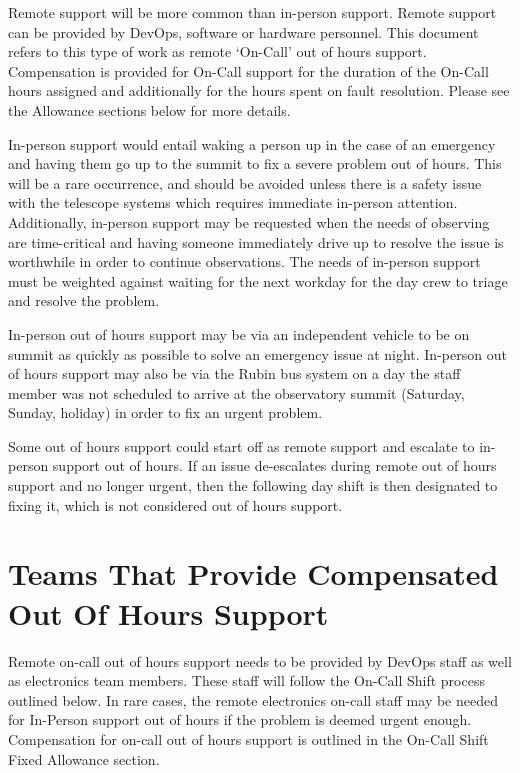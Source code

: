 Remote support will be more common than in-person support.  Remote support can be provided by DevOps, software or hardware personnel.  This document refers to this type of work as remote `On-Call' out of hours support. Compensation is provided for On-Call support for the duration of the On-Call hours assigned and additionally for the hours spent on fault resolution.  Please see the Allowance sections below for more details.

In-person support would entail waking a person up in the case of an emergency and having them go up to the summit to fix a severe problem out of hours. 
This will be a rare occurrence, and should be avoided unless there is a safety issue with the telescope systems which requires immediate in-person attention.
Additionally, in-person support may be requested when the needs of observing are time-critical and having someone immediately drive up to resolve the issue is worthwhile in order to continue observations.  
The needs of in-person support must be weighted against waiting for the next workday for the day crew to triage and resolve the problem.

In-person out of hours support may be via an independent vehicle to be on summit as quickly as possible to solve an emergency issue at night.  In-person out of hours support may also be via the Rubin bus system on a day the staff member was not scheduled to arrive at the observatory summit (Saturday, Sunday, holiday) in order to fix an urgent problem.

Some out of hours support could start off as remote support and escalate to in-person support out of hours.  If an issue de-escalates during remote out of hours support and no longer urgent, then the following day shift is then designated to fixing it, which is not considered out of hours support.

\section{Teams That Provide Compensated Out Of Hours Support}

Remote on-call out of hours support needs to be provided by DevOps staff as well as electronics team members.  These staff will follow the On-Call Shift process outlined below.  In rare cases, the remote electronics on-call staff may be needed for In-Person support out of hours if the problem is deemed urgent enough.  Compensation for on-call out of hours support is outlined in the On-Call Shift Fixed Allowance section.

